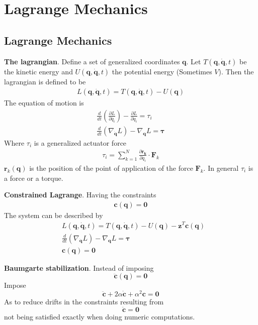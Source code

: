 \setcounter{section}{3}
\section{Lagrange Mechanics}
\setcounter{section}{8}
\setcounter{subsection}{1}
\subsection{Lagrange Mechanics} %

\textbf{The lagrangian}. Define a set of generalized coordinates \(\bm{q}\). Let
 \(T(\bm{q},\dot{\bm{q}},t)\) be the kinetic energy and 
\(U(\bm{q},\bm{\dot{q}},t)\) the potential energy (Sometimes \(V\)). Then the lagrangian is
defined to be
\begin{align*}
    L(\bm{q},\dot{\bm{q}},t) = T(\bm{q},\dot{\bm{q}},t)-U(\bm{q})
\end{align*}
The equation of motion is
\begin{align*}
    \frac{d}{dt}\left(\frac{\partial L}{\partial \dot{q_i}}\right) - \frac{\partial L}{\partial q_i} = \tau_i \\
    \frac{d}{dt}\left(\nabla_{\dot{\bm{q}}}L\right) - \nabla_{\bm{q}}L = \bm{\tau}
\end{align*}
Where \(\tau_i\) is a generalized actuator force
\begin{align*}
    \tau_i = \sum_{k=1}^{N}\frac{\partial \bm{r_k}}{\partial q_i} \cdot \bm{F}_k
\end{align*}
\(\bm{r}_k(\bm{q})\) is the position of the point of application of the force \(\bm{F}_k\).
In general \(\tau_i\) is a force or a torque.
\newline

\textbf{Constrained Lagrange}. Having the constraints
\begin{align*}
    \bm{c}(\bm{q}) = \bm{0}
\end{align*}
The system can be described by
\begin{align*}
    & L(\bm{q},\dot{\bm{q}},t) = T(\bm{q},\dot{\bm{q}},t)-U(\bm{q})  - \bm{z}^T\bm{c}(\bm{q}) \\
    & \frac{d}{dt}\left(\nabla_{\dot{\bm{q}}}L\right) - \nabla_{\bm{q}}L = \bm{\tau} \\
    & \bm{c}(\bm{q}) = \bm{0}
\end{align*}

\textbf{Baumgarte stabilization}. Instead of imposing
\[\ddot{\bm{c}}(\bm{q}) =\bm{0}\]
Impose
\[\ddot{\bm{c}}+2\alpha\dot{\bm{c}}+\alpha^2\bm{c} = \bm{0}\]
As to reduce drifts in the constraints resulting from 
\[\ddot{\bm{c}}=\bm{0}\]
not being satisfied exactly when doing numeric computations.


